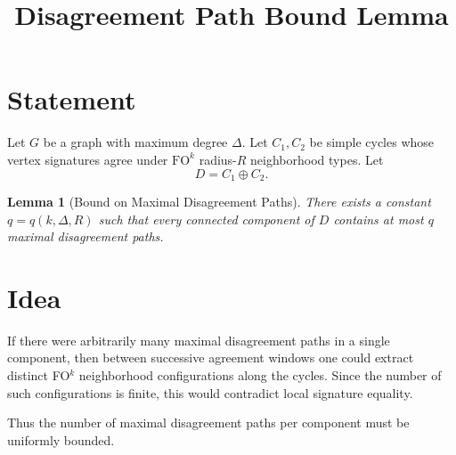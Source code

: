 \documentclass[11pt]{article}
\title{Disagreement Path Bound Lemma}
\date{}
\newtheorem{lemma}{Lemma}
\begin{document}
\maketitle

\section*{Statement}

Let \(G\) be a graph with maximum degree \(\Delta\).  
Let \(C_1,C_2\) be simple cycles whose vertex signatures agree under
\(\mathrm{FO}^k\) radius-\(R\) neighborhood types.  
Let
\[
D=C_1\oplus C_2 .
\]

\begin{lemma}[Bound on Maximal Disagreement Paths]

There exists a constant \(q=q(k,\Delta,R)\) such that every connected
component of \(D\) contains at most \(q\) maximal disagreement paths.

\end{lemma}

\section*{Idea}

If there were arbitrarily many maximal disagreement paths in a single
component, then between successive agreement windows one could extract
distinct FO\(^k\) neighborhood configurations along the cycles.
Since the number of such configurations is finite, this would contradict
local signature equality.

Thus the number of maximal disagreement paths per component must be
uniformly bounded.
\end{document}
